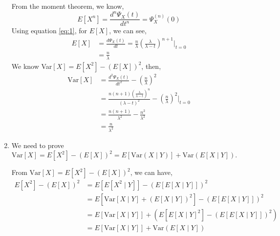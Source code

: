 \documentclass{article}
\begin{document}
\begin{enumerate}
				From the moment theorem, we know,
				\begin{equation}
					E[X^n] = \frac{d^n\Psi_{X}(t)}{dt^n} = \Psi_{X}^{(n)}(0)
					\label{eq:1}
				\end{equation}
				Using equation \ref{eq:1}, for $E[X]$, we can see,
				\begin{align*}
					E[X] &= \frac{d\Psi_{X}(t)}{dt} = \frac{n}{\lambda}\left(\frac{\lambda}{\lambda-t}\right)^{n+1} \bigg|_{t=0} \\
					&= \frac{n}{\lambda}
				\end{align*}
				We know Var$[X] = E[X^2] - \left(E[X]\right)^2$, then,
				\begin{align*}
					\mathrm{Var}[X] &= \frac{d^2\Psi_{X}(t)}{dt^2} - \left(\frac{n}{\lambda}\right)^2 \\
					&= \frac{n(n+1)\left(\frac{\lambda}{\lambda-t}\right)^n}{\left(\lambda-t\right)^2} - \left(\frac{n}{\lambda}\right)^2 \bigg|_{t=0} \\
					&= \frac{n(n+1)}{\lambda^2} - \frac{n^2}{\lambda^2} \\
					&= \frac{n}{\lambda^2}
				\end{align*}
			\item We need to prove $\mathrm{Var}[X] = E[X^2] - (E[X])^2 = E[\mathrm{Var}(X \mid Y)] + \mathrm{Var}(E[X \mid Y])$.

				From $\mathrm{Var}[X] = E[X^2] - (E[X])^2$, we can have,
				\begin{align*}
					E[X^2] - (E[X])^2 &= E[E[X^2 \mid Y]] - (E[E[X \mid Y]])^2 \\
					&= E[\mathrm{Var}[X \mid Y] + (E[X \mid Y])^2] - (E[E[X \mid Y]])^2 \\
					&= E[\mathrm{Var}[X \mid Y]] + (E[E[X \mid Y]^2] - (E[E[X \mid Y]])^2) \\
					&= E[\mathrm{Var}[X \mid Y]] + \mathrm{Var}(E[X \mid Y])
				\end{align*}


\end{enumerate}
\end{document}
